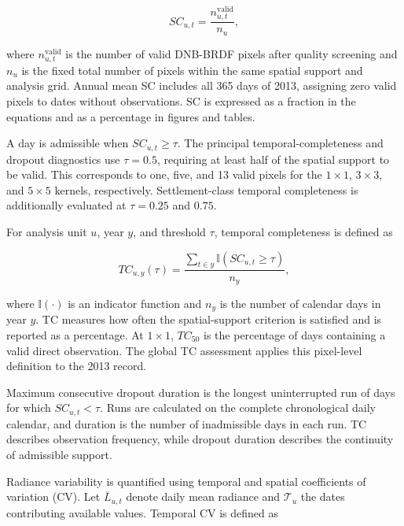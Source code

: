 \documentclass[]{interact}
\theoremstyle{plain}%
\theoremstyle{definition}
\theoremstyle{remark}
\begin{document}
        \begin{equation}
        SC_{u,t} = \frac{n_{u,t}^{\text{valid}}}{n_u},
        \end{equation}
        
        where $n_{u,t}^{\text{valid}}$ is the number of valid DNB-BRDF pixels after quality screening and $n_u$ is the fixed total number of pixels within the same spatial support and analysis grid. Annual mean SC includes all 365 days of 2013, assigning zero valid pixels to dates without observations. SC is expressed as a fraction in the equations and as a percentage in figures and tables.
        
        A day is admissible when $SC_{u,t}\geq\tau$. The principal temporal-completeness and dropout diagnostics use $\tau=0.5$, requiring at least half of the spatial support to be valid. This corresponds to one, five, and 13 valid pixels for the $1\times1$, $3\times3$, and $5\times5$ kernels, respectively. Settlement-class temporal completeness is additionally evaluated at $\tau=0.25$ and $0.75$.
        
        For analysis unit $u$, year $y$, and threshold $\tau$, temporal completeness is defined as
        
        \begin{equation}
        TC_{u,y}(\tau) =
        \frac{
            \sum_{t\in y}
            \mathbb{I}\!\left(SC_{u,t}\geq\tau\right)
        }{
            n_y
        },
        \label{eq:temporal_completeness}
        \end{equation}
        
        where $\mathbb{I}(\cdot)$ is an indicator function and $n_y$ is the number of calendar days in year $y$. TC measures how often the spatial-support criterion is satisfied and is reported as a percentage. At $1\times1$, $TC_{50}$ is the percentage of days containing a valid direct observation. The global TC assessment applies this pixel-level definition to the 2013 record.
        
        Maximum consecutive dropout duration is the longest uninterrupted run of days for which $SC_{u,t}<\tau$. Runs are calculated on the complete chronological daily calendar, and duration is the number of inadmissible days in each run. TC describes observation frequency, while dropout duration describes the continuity of admissible support.
        
        Radiance variability is quantified using temporal and spatial coefficients of variation (CV). Let $\overline{L}_{u,t}$ denote daily mean radiance and $\mathcal{T}_u$ the dates contributing available values. Temporal CV is defined as
        
\end{document}
